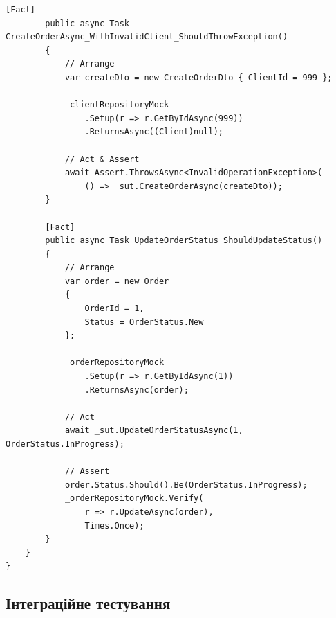 \documentclass[14pt,a4paper]{extarticle}
\begin{document}
\begin{lstlisting}[language={[Sharp]C}, caption=Тести для OrderService, basicstyle=\small\ttfamily, breaklines=true, frame=single]
        [Fact]
        public async Task CreateOrderAsync_WithInvalidClient_ShouldThrowException()
        {
            // Arrange
            var createDto = new CreateOrderDto { ClientId = 999 };
            
            _clientRepositoryMock
                .Setup(r => r.GetByIdAsync(999))
                .ReturnsAsync((Client)null);
            
            // Act & Assert
            await Assert.ThrowsAsync<InvalidOperationException>(
                () => _sut.CreateOrderAsync(createDto));
        }
        
        [Fact]
        public async Task UpdateOrderStatus_ShouldUpdateStatus()
        {
            // Arrange
            var order = new Order 
            { 
                OrderId = 1, 
                Status = OrderStatus.New 
            };
            
            _orderRepositoryMock
                .Setup(r => r.GetByIdAsync(1))
                .ReturnsAsync(order);
            
            // Act
            await _sut.UpdateOrderStatusAsync(1, OrderStatus.InProgress);
            
            // Assert
            order.Status.Should().Be(OrderStatus.InProgress);
            _orderRepositoryMock.Verify(
                r => r.UpdateAsync(order), 
                Times.Once);
        }
    }
}
\end{lstlisting}

\newpage
\subsection{Інтеграційне тестування}
\end{document}
